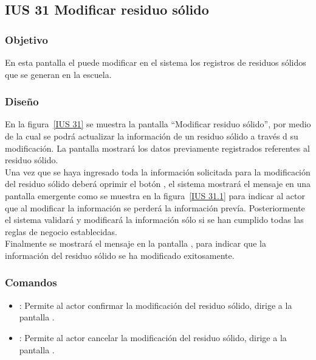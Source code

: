 \subsection{IUS 31 Modificar residuo sólido}

\subsubsection{Objetivo}

      En esta pantalla el  puede modificar en el sistema los registros de residuos sólidos que se generan en la escuela.

\subsubsection{Diseño}

    En la figura~\ref{IUS 31} se muestra la pantalla ``Modificar residuo sólido'', por medio de la cual se podrá actualizar la información de un residuo sólido a través d su modificación. La pantalla mostrará los datos previamente registrados referentes al residuo sólido.\\
        
    Una vez que se haya ingresado toda la información solicitada para la modificación del residuo sólido deberá oprimir el botón , el sistema mostrará el mensaje  en una pantalla emergente como se muestra en la figura~\ref{IUS 31.1} para indicar al actor que al modificar la información se perderá la información prevía. Posteriormente el sistema validará y modificará la información sólo si se han cumplido todas las reglas de negocio establecidas.\\
    
    Finalmente se mostrará el mensaje  en la pantalla , para indicar que la información del residuo sólido se ha modificado exitosamente.
      


\subsubsection{Comandos}
    \begin{itemize}
	\item {}: Permite al actor confirmar la modificación del residuo sólido, dirige a la pantalla .
	\item {}: Permite al actor cancelar la modificación del residuo sólido, dirige a la pantalla .
    \end{itemize}

